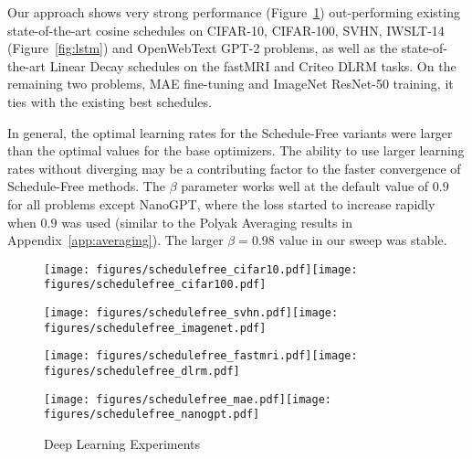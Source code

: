 \documentclass{article}
\begin{document}
Our approach shows very strong performance (Figure~\ref{fig:dlexperiments}) out-performing existing state-of-the-art cosine schedules on CIFAR-10, CIFAR-100, SVHN,  IWSLT-14 (Figure~\ref{fig:lstm}) and OpenWebText GPT-2 problems, as well as the state-of-the-art Linear Decay schedules on the fastMRI and Criteo DLRM tasks. On the remaining two problems, MAE fine-tuning and ImageNet ResNet-50 training, it ties with the existing best schedules.

In general, the optimal learning rates for the Schedule-Free variants were larger than the optimal values for the base optimizers. The ability to use larger learning rates without diverging may be a contributing factor to the faster convergence of Schedule-Free methods. The $\beta$ parameter works well at the default value of $0.9$ for all problems except NanoGPT, where the loss started to increase rapidly when $0.9$ was used (similar to the Polyak Averaging results in Appendix~\ref{app:averaging}). The larger $\beta=0.98$ value in our sweep was stable. 

\begin{figure}
\newcommand{\figwidth}{0.5\textwidth}
\center\texttt{[image: figures/schedulefree\_cifar10.pdf]}\texttt{[image: figures/schedulefree\_cifar100.pdf]}

\texttt{[image: figures/schedulefree\_svhn.pdf]}\texttt{[image: figures/schedulefree\_imagenet.pdf]}

\texttt{[image: figures/schedulefree\_fastmri.pdf]}\texttt{[image: figures/schedulefree\_dlrm.pdf]}

\texttt{[image: figures/schedulefree\_mae.pdf]}\texttt{[image: figures/schedulefree\_nanogpt.pdf]}\caption{\label{fig:dlexperiments}Deep Learning Experiments}
\end{figure}
\end{document}
